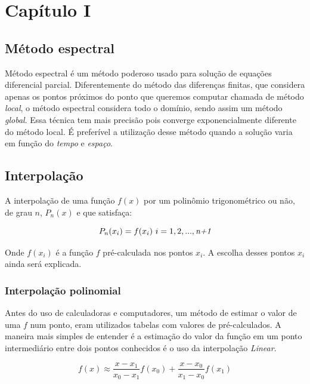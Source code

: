 \chapter{Capítulo I}
\label{cap:I}
\section{Método espectral}

 Método espectral é um método poderoso usado para solução de equações diferencial parcial. Diferentemente do método das diferenças finitas, que considera apenas os pontos próximos do ponto que queremos computar chamada de método \emph{local}, o método espectral considera todo o domínio, sendo assim um método \emph{global}. Essa técnica tem mais precisão pois converge exponencialmente diferente do método local. É preferível a utilização desse método quando a solução varia em função do \textit{tempo} e \textit{espaço}.

\section{Interpolação}
 A interpolação de uma função $f(x)$ por um polinômio trigonométrico ou não, de grau $n$, $P_{n}(x)$ e que satisfaça:

\begin{equation}
	P_n (x_i) = f(x_i) \ i = 1,2,...,\emph{n+1}
\end{equation}

 Onde $f(x_i)$ é a função $f$ pré-calculada nos pontos $x_i$. A escolha desses pontos $x_i$ ainda será explicada.
 
\subsection{Interpolação polinomial}

 Antes do uso de calculadoras e computadores, um método de estimar o valor de uma $f$ num ponto, eram utilizados tabelas com valores de pré-calculados. A maneira mais simples de entender é a estimação do valor da função em um ponto intermediário entre dois pontos conhecidos é o uso da interpolação \emph{Linear}.

\begin{equation}
	f(x) \approx \frac{x - x_1}{x_0 - x_1}f(x_0)  + 							 \frac{x - x_0}{x_1 - x_0}f(x_1)
\end{equation} 
 
